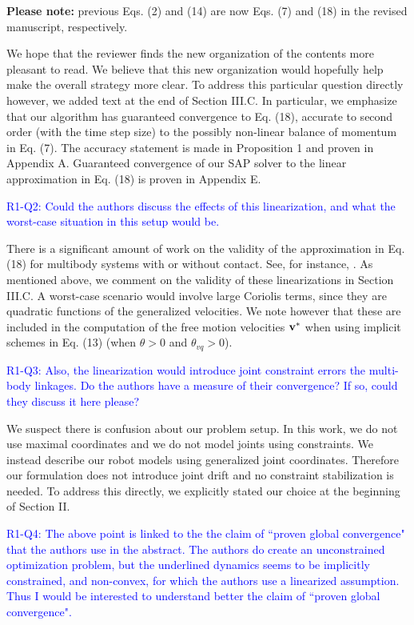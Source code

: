 \textbf{Please note:} previous Eqs. (2) and (14) are now Eqs. (7) and (18) in the
revised manuscript, respectively.

We hope that the reviewer finds the new organization of the contents more
pleasant to read. We believe that this new organization would hopefully help
make the overall strategy more clear. To address this particular question
directly however, we added text at the end of Section III.C. In particular, we
emphasize that our algorithm has guaranteed convergence to Eq. (18), accurate to
second order (with the time step size) to the possibly non-linear balance of
momentum in Eq. (7). The accuracy statement is made in Proposition 1 and proven
in Appendix A. Guaranteed convergence of our SAP solver to the linear
approximation in Eq. (18) is proven in Appendix E.
\vspace{5mm}

\textcolor{blue}{
R1-Q2: Could the authors discuss the effects of this linearization, and what the
worst-case situation in this setup would be. }

There is a significant amount of work on the validity of the approximation in
Eq. (18) for multibody systems with or without contact. See, for instance,
\cite{bib:potra2006linearly}. As mentioned above, we comment on the validity of
these linearizations in Section III.C. A worst-case scenario would involve large
Coriolis terms, since they are quadratic functions of the generalized
velocities. We note however that these are included in the computation of the
free motion velocities ${\mathbf{v}}^*$ when using implicit schemes in Eq. (13) (when
$\theta>0$ and $\theta_{vq}>0$).
\vspace{5mm}

\textcolor{blue}{
R1-Q3: Also, the linearization would introduce joint constraint errors the
multi-body linkages. Do the authors have a measure of their convergence? If so,
could they discuss it here please?}

We suspect there is confusion about our problem setup. In this work, we do not
use maximal coordinates and we do not model joints using constraints. We instead
describe our robot models using generalized joint coordinates. Therefore our
formulation does not introduce joint drift and no constraint
stabilization is needed. To address this directly, we explicitly stated our
choice at the beginning of Section II.
\vspace{5mm}

\textcolor{blue}{
R1-Q4: The above point is linked to the the claim of ``proven global convergence"
that the authors use in the abstract. The authors do create an unconstrained
optimization problem, but the underlined dynamics seems to be implicitly
constrained, and non-convex, for which the authors use a linearized
assumption. Thus I would be interested to understand better the claim of ``proven global
convergence".}

